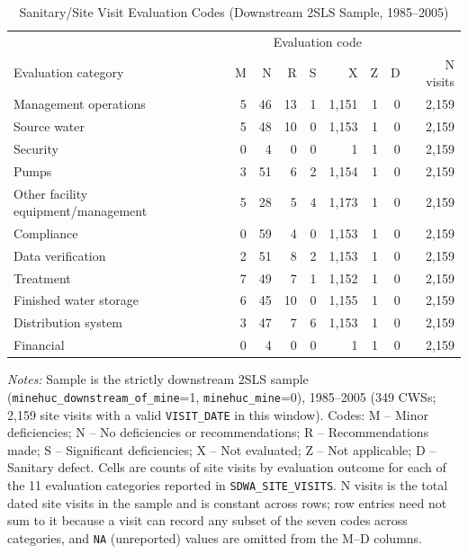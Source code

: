 \begin{table}[htbp]
\centering
\caption{Sanitary/Site Visit Evaluation Codes (Downstream 2SLS Sample, 1985--2005)}
\label{tab:sanitary_visit_eval_code_summary}
\small
\begin{tabular}{lrrrrrrrr}
\hline\hline
 & \multicolumn{7}{c}{Evaluation code} & \\
Evaluation category & M & N & R & S & X & Z & D & N visits \\
\hline
Management operations &     5 &    46 &    13 &     1 & 1,151 &     1 &     0 & 2,159 \\
Source water &     5 &    48 &    10 &     0 & 1,153 &     1 &     0 & 2,159 \\
Security & 0 & 4 & 0 & 0 & 1 & 1 & 0 & 2,159 \\
Pumps &     3 &    51 &     6 &     2 & 1,154 &     1 &     0 & 2,159 \\
Other facility equipment/management &     5 &    28 &     5 &     4 & 1,173 &     1 &     0 & 2,159 \\
Compliance &     0 &    59 &     4 &     0 & 1,153 &     1 &     0 & 2,159 \\
Data verification &     2 &    51 &     8 &     2 & 1,153 &     1 &     0 & 2,159 \\
Treatment &     7 &    49 &     7 &     1 & 1,152 &     1 &     0 & 2,159 \\
Finished water storage &     6 &    45 &    10 &     0 & 1,155 &     1 &     0 & 2,159 \\
Distribution system &     3 &    47 &     7 &     6 & 1,153 &     1 &     0 & 2,159 \\
Financial & 0 & 4 & 0 & 0 & 1 & 1 & 0 & 2,159 \\
\hline\hline
\end{tabular}
\begin{minipage}{\linewidth}
\vspace{4pt}
\footnotesize
\textit{Notes:} Sample is the strictly downstream 2SLS sample (\texttt{minehuc\_downstream\_of\_mine}=1, \texttt{minehuc\_mine}=0), 1985--2005 (349 CWSs; 2,159 site visits with a valid \texttt{VISIT\_DATE} in this window). Codes: M -- Minor deficiencies; N -- No deficiencies or recommendations; R -- Recommendations made; S -- Significant deficiencies; X -- Not evaluated; Z -- Not applicable; D -- Sanitary defect. Cells are counts of site visits by evaluation outcome for each of the 11 evaluation categories reported in \texttt{SDWA\_SITE\_VISITS}. N visits is the total dated site visits in the sample and is constant across rows; row entries need not sum to it because a visit can record any subset of the seven codes across categories, and \texttt{NA} (unreported) values are omitted from the M--D columns.
\end{minipage}
\end{table}
